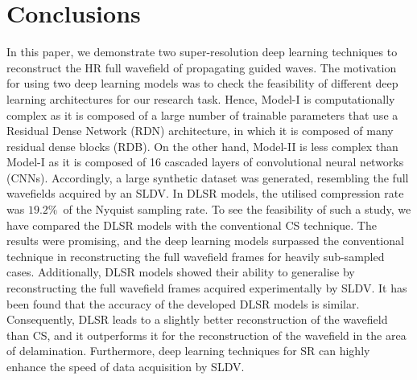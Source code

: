 \section{Conclusions}
\label{conclusion}
In this paper, we demonstrate two super-resolution deep learning techniques to reconstruct the HR full wavefield of propagating guided waves.
The motivation for using two deep learning models was to check the feasibility of different deep learning architectures for our research task. 
Hence, Model-I is computationally complex as it is composed of a large number of trainable parameters that use a Residual Dense Network (RDN) architecture, in which it is composed of many residual dense blocks (RDB). 
On the other hand, Model-II is less complex than Model-I as it is composed of 16 cascaded layers of convolutional neural networks (CNNs).
Accordingly, a large synthetic dataset was generated, resembling the full wavefields acquired by an SLDV.
In DLSR models, the utilised compression rate was \(19.2\%\)\ of the Nyquist sampling rate.
To see the feasibility of such a study, we have compared the DLSR models with the conventional CS technique. 
The results were promising, and the deep learning models surpassed the conventional technique in reconstructing the full wavefield frames for heavily sub-sampled cases.
Additionally, DLSR models showed their ability to generalise by reconstructing the full wavefield frames acquired experimentally by SLDV.
It has been found that the accuracy of the developed DLSR models is similar.
Consequently, DLSR leads to a slightly better reconstruction of the wavefield than CS, and it outperforms it for the reconstruction of the wavefield in the area of delamination.
Furthermore, deep learning techniques for SR can highly enhance the speed of data acquisition by SLDV.

